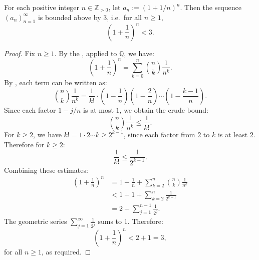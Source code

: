\begin{lemma} \label{lemma:sequence_one_plus_one_over_n_to_the_n_is_bounded_above_by_3}
    For each positive integer $n \in \mathbb{Z}_{> 0}$, let $a_n := (1 + 1/n)^n$. Then the sequence $(a_n)_{n=1}^\infty$ is bounded above by $3$, i.e.\ for all $n \geq 1$,
    $$\left(1 + \frac{1}{n}\right)^n < 3.$$
\end{lemma}

\begin{proof}
    Fix $n \geq 1$. By the , applied to $\mathbb{Q}$, we have:
    $$\left(1 + \frac{1}{n}\right)^n = \sum_{k=0}^n \binom{n}{k} \frac{1}{n^k}.$$
    By , each term can be written as:
    $$\binom{n}{k} \frac{1}{n^k} = \frac{1}{k!} \cdot \left(1 - \frac{1}{n}\right) \left(1 - \frac{2}{n}\right) \cdots \left(1 - \frac{k-1}{n}\right).$$
    Since each factor $1 - j/n$ is at most $1$, we obtain the crude bound:
    $$\binom{n}{k} \frac{1}{n^k} \leq \frac{1}{k!}.$$
    For $k \geq 2$, we have $k! = 1 \cdot 2 \cdots k \geq 2^{k-1}$, since each factor from $2$ to $k$ is at least $2$. Therefore for $k \geq 2$:
    $$\frac{1}{k!} \leq \frac{1}{2^{k-1}}.$$
    Combining these estimates:
    $$\begin{aligned}
        \left(1 + \frac{1}{n}\right)^n &= 1 + \frac{1}{n} + \sum_{k=2}^n \binom{n}{k} \frac{1}{n^k} \\
        &< 1 + 1 + \sum_{k=2}^n \frac{1}{2^{k-1}} \\
        &= 2 + \sum_{j=1}^{n-1} \frac{1}{2^j}.
    \end{aligned}$$
    The geometric series $\sum_{j=1}^\infty \frac{1}{2^j}$ sums to $1$. Therefore:
    $$\left(1 + \frac{1}{n}\right)^n < 2 + 1 = 3,$$
    for all $n \geq 1$, as required.
\end{proof}
